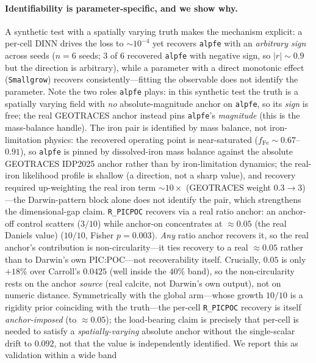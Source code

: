 \documentclass[11pt]{article}
\begin{document}
\paragraph{Identifiability is parameter-specific, and we show why.}
A synthetic test with a spatially varying truth makes the mechanism explicit: a
per-cell DINN drives the loss to $\sim10^{-4}$ yet recovers \texttt{alpfe} with
an \emph{arbitrary sign} across seeds ($n=6$ seeds; $3$ of $6$ recovered
\texttt{alpfe} with negative sign, so $|r|\sim0.9$ but the direction is
arbitrary), while a
parameter with a direct monotonic effect (\texttt{Smallgrow}) recovers
consistently---fitting the observable does not identify the parameter. Note the
two roles \texttt{alpfe} plays: in this synthetic test the truth is a
spatially varying field with \emph{no} absolute-magnitude anchor on
\texttt{alpfe}, so its \emph{sign} is free; the real GEOTRACES anchor instead
pins \texttt{alpfe}'s \emph{magnitude} (this is the mass-balance handle). The iron
pair is identified by mass balance, not iron-limitation physics: the recovered
operating point is near-saturated ($f_{\mathrm{Fe}}\sim0.67$--$0.91$), so
\texttt{alpfe} is pinned by dissolved-iron mass balance against the absolute
GEOTRACES IDP2025 anchor rather than by iron-limitation dynamics; the real-iron
likelihood profile is shallow (a direction, not a sharp value), and recovery
required up-weighting the real iron term $\sim10\times$ (GEOTRACES weight
$0.3\to3$)---the Darwin-pattern block alone does not identify the pair, which
strengthens the dimensional-gap claim. \texttt{R\_PICPOC} recovers via a real
ratio anchor: an anchor-off control scatters ($3/10$) while anchor-on
concentrates at $\approx0.05$ (the real Daniels value) ($10/10$, Fisher
$p=0.003$). \emph{Any} ratio
anchor recovers it, so the real anchor's contribution is non-circularity---it
ties recovery to a real $\approx0.05$ rather than to Darwin's own PIC:POC---not
recoverability itself. Crucially, $0.05$ is only $+18\%$ over Carroll's $0.0425$
(well inside the $40\%$ band), so the non-circularity rests on the anchor
\emph{source} (real calcite, not Darwin's own output), not on numeric distance.
Symmetrically with the global arm---whose growth $10/10$ is a rigidity prior
coinciding with the truth---the per-cell \texttt{R\_PICPOC} recovery is itself
\emph{anchor-imposed} (to $\approx0.05$); the load-bearing claim is precisely that
per-cell is needed to satisfy a \emph{spatially-varying} absolute anchor without
the single-scalar drift to $0.092$, not that the value is independently
identified. We report this as validation within a wide band
\end{document}
